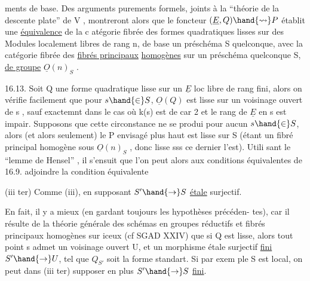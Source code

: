 
ments de base. Des arguments purements formels, joints à la
``théorie de la descente plate'' de  V  , montreront alors que le foncteur
$(\underline{E},Q) \hand{\rightsquigarrow} P$ établit une \uline{équivalence} de la c atégorie fibrée des formes
quadratiques lisses sur des Modules localement libres de rang n, de base
un préschéma S quelconque, avec la catégorie fibrée des \uline{fibrés principaux}
\uline{homogènes} sur un préschéma quelconque S, \uline{de groupe} $\underline{O}(n)_S$ .

16.13. Soit Q une forme quadratique lisse sur un $\underline{E}$ loc libre de
rang fini, alors on vérifie facilement que pour $s \hand{\in} S$, $\underline{O}(Q)$ est lisse
sur un voisinage ouvert de s ,  sauf exactemnt dans
le cas où k(s) est de car 2 et le rang de $\underline{E}$ en s est impair. Supposons
que cette circonstance ne se produi pour aucun $s \hand{\in} S$, alors (et alors
seulement) le P envisagé plus haut est lisse sur S (étant un fibré
principal homogène sous $\underline{O}(n)_S$ , donc lisse sss ce dernier l'est). Utili
sant le ``lemme de Hensel'' , il s'ensuit que  l'on peut alors aux
conditions équivalentes de 16.9. adjoindre la condition  équivalente

(iii ter)  Comme (iii), en supposant $S' \hand{\to} S$
\uline{étale} surjectif.

En fait, il y a mieux (en gardant toujours les hypothèses précéden-%
tes), car il résulte de la théorie générale des schémas en groupes réductifs
et fibrés principaux homogènes sur iceux (cf SGAD XXIV) que  si Q est
lisse, alors tout point s admet un voisinage ouvert U, et un morphisme
étale surjectif \uline{fini} $S' \hand{\to} U$, tel que $Q_{S'}$ soit la forme standart. Si par exem
ple S est local, on peut dans (iii ter) supposer en plus $S' \hand{\to} S$ \uline{fini}.

